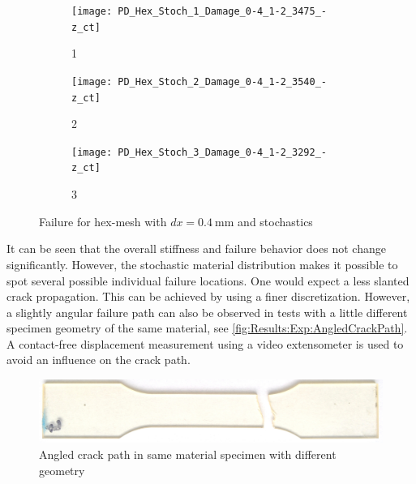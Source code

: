 \begin{figure}[htbp]
\begin{subfigure}{0.10\linewidth}
\begin{minipage}[b][\figheight]{\linewidth}
      \texttt{[image: PD\_Hex\_Stoch\_1\_Damage\_0-4\_1-2\_3475\_-z\_ct]}
    \end{minipage}
    \caption{1}
  \end{subfigure}
  \hfill
  \begin{subfigure}{0.10\linewidth}
    \begin{minipage}[b][\figheight]{\linewidth}
      \centering
      \texttt{[image: PD\_Hex\_Stoch\_2\_Damage\_0-4\_1-2\_3540\_-z\_ct]}
    \end{minipage}
    \caption{2}
  \end{subfigure}
  \begin{subfigure}{0.10\linewidth}
    \begin{minipage}[b][\figheight]{\linewidth}
      \centering
      \texttt{[image: PD\_Hex\_Stoch\_3\_Damage\_0-4\_1-2\_3292\_-z\_ct]}
    \end{minipage}
    \caption{3}
  \end{subfigure}
  \caption{Failure for hex-mesh with $dx=\SI{0.4}{\milli\meter}$ and stochastics}
  \label{fig:Results:Hex:Stoch}
\end{figure}

It can be seen that the overall stiffness and failure behavior does not change significantly. However, the stochastic material distribution makes it possible to spot several possible individual failure locations. One would expect a less slanted crack propagation. This can be achieved by using a finer discretization. However, a slightly angular failure path can also be observed in tests with a little different specimen geometry of the same material, see \autoref{fig:Results:Exp:AngledCrackPath}. A contact-free displacement measurement using a video extensometer is used to avoid an influence on the crack path.

\begin{figure}
  \centering
  \includegraphics[width=0.5\linewidth,keepaspectratio]{../../Material/Figures/KrauseD_Damage_LY564_statisch}
  \caption{Angled crack path in same material specimen with different geometry \cite{KrauseD2016}}
  \label{fig:Results:Exp:AngledCrackPath}
\end{figure}

